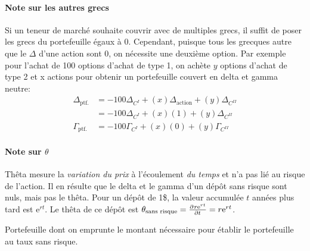 \documentclass[10pt, french]{article}
\begin{document}
\begin{multicols*}{2}
\paragraph{Note sur les autres grecs}	Si un teneur de marché souhaite couvrir avec de multiples grecs, il suffit de poser les grecs du portefeuille égaux à 0. Cependant, puisque tous les grecques autre que le $\Delta$ d'une action sont 0, on nécessite une deuxième option. Par exemple pour l'achat de 100 options d'achat de type 1, on achète $y$ options d'achat de type 2 et x actions pour obtenir un portefeuille couvert en delta et gamma neutre:
\begin{align*}
	\Delta_{\text{ptf.}}
	&=	-100 \Delta_{C^{I}} + (x)\Delta_{\text{action}} + (y)\Delta_{C^{II}}	\\
	&=	-100 \Delta_{C^{I}} + (x)(1) + (y)\Delta_{C^{II}}	\\
	\Gamma_{\text{ptf.}}
	&=	-100 \Gamma_{C^{I}} + (x)(0) + (y)\Gamma_{C^{II}}	
\end{align*}

\paragraph{Note sur $\theta$} Thêta mesure la \textit{variation du prix} à l'écoulement \textit{du temps} et n'a pas lié au risque de l'action. Il en résulte que le delta et le gamma d'un dépôt sans risque sont nuls, mais pas le thêta. Pour un dépôt de 1\$, la valeur accumulée $t$ années plus tard est $\textrm{e}^{rt}$. Le thêta de ce dépôt est $\theta_{\text{sans risque}}	=	\deriv{t}{r\textrm{e}^{rt}}	=	r\textrm{e}^{rt}$. 

\begin{definitionNOHFILL}
Portefeuille dont on emprunte le montant nécessaire pour établir le portefeuille au taux sans risque.
\end{definitionNOHFILL}


\columnbreak

\end{multicols*}
\end{document}
